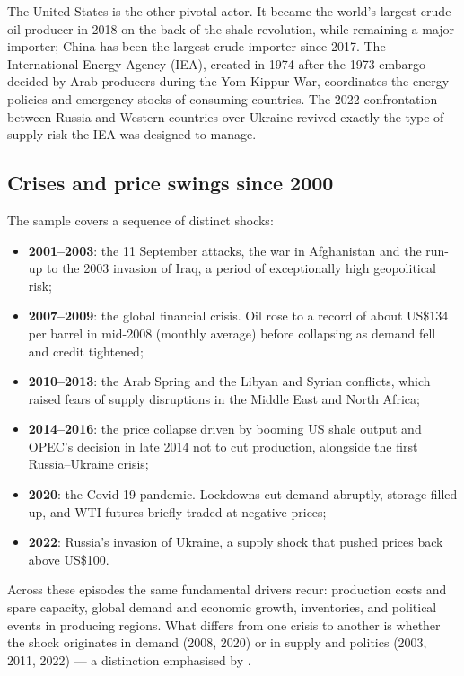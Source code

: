 \documentclass[11pt,a4paper]{article}
\begin{document}
The United States is the other pivotal actor. It became the world's largest
crude-oil producer in 2018 on the back of the shale revolution, while remaining a
major importer; China has been the largest crude importer since 2017. The
International Energy Agency (IEA), created in 1974 after the 1973 embargo decided
by Arab producers during the Yom Kippur War, coordinates the energy policies and
emergency stocks of consuming countries. The 2022 confrontation between Russia
and Western countries over Ukraine revived exactly the type of supply risk the
IEA was designed to manage.

\subsection{Crises and price swings since 2000}

The sample covers a sequence of distinct shocks:
\begin{itemize}
\item \textbf{2001--2003}: the 11 September attacks, the war in Afghanistan and the
run-up to the 2003 invasion of Iraq, a period of exceptionally high geopolitical
risk;
\item \textbf{2007--2009}: the global financial crisis. Oil rose to a record of
about US\$134 per barrel in mid-2008 (monthly average) before collapsing as
demand fell and credit tightened;
\item \textbf{2010--2013}: the Arab Spring and the Libyan and Syrian conflicts,
which raised fears of supply disruptions in the Middle East and North Africa;
\item \textbf{2014--2016}: the price collapse driven by booming US shale output
and OPEC's decision in late 2014 not to cut production, alongside the first
Russia--Ukraine crisis;
\item \textbf{2020}: the Covid-19 pandemic. Lockdowns cut demand abruptly,
storage filled up, and WTI futures briefly traded at negative prices;
\item \textbf{2022}: Russia's invasion of Ukraine, a supply shock that pushed
prices back above US\$100.
\end{itemize}

Across these episodes the same fundamental drivers recur: production costs and
spare capacity, global demand and economic growth, inventories, and political
events in producing regions. What differs from one crisis to another is whether
the shock originates in demand (2008, 2020) or in supply and politics (2003,
2011, 2022) --- a distinction emphasised by \citet{kilian2009}.
\end{document}
